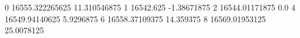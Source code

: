 0 16555.322265625 11.310546875
1 16542.625 -1.38671875
2 16544.01171875 0.0
4 16549.94140625 5.9296875
6 16558.37109375 14.359375
8 16569.01953125 25.0078125
